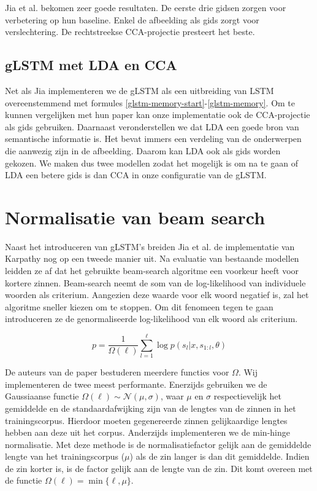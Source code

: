 Jia et al. bekomen zeer goede resultaten. De eerste drie gidsen zorgen voor verbetering op hun baseline. Enkel de afbeelding als gids zorgt voor verslechtering. De rechtstreekse CCA-projectie presteert het beste.

\subsection{gLSTM met LDA en CCA}
Net als Jia implementeren we de gLSTM als een uitbreiding van LSTM overeenstemmend met formules \ref{glstm-memory-start}-\ref{glstm-memory}.
Om te kunnen vergelijken met hun paper kan onze implementatie ook de CCA-projectie als gids gebruiken.
Daarnaast veronderstellen we dat LDA een goede bron van semantische informatie is. Het bevat immers een verdeling van de onderwerpen die aanwezig zijn in de afbeelding. Daarom kan LDA ook als gids worden gekozen.
We maken dus twee modellen zodat het mogelijk is om na te gaan of LDA een betere gids is dan CCA in onze configuratie van de gLSTM.

\section{Normalisatie van beam search}
Naast het introduceren van gLSTM's breiden Jia et al. \cite{Fernando2015} de implementatie van Karpathy nog op een tweede manier uit. Na evaluatie van bestaande modellen leidden ze af dat het gebruikte beam-search algoritme een voorkeur heeft voor kortere zinnen. Beam-search neemt de som van de log-likelihood van individuele woorden als criterium. Aangezien deze waarde voor elk woord negatief is, zal het algoritme sneller kiezen om te stoppen. Om dit fenomeen tegen te gaan introduceren ze de genormaliseerde log-likelihood van elk woord als criterium.

\begin{equation}
p = \frac{1}{\Omega(\ell)}\sum_{l=1}^{\ell} \log p(s_l | x, s_{1:l}, \theta)
\label{eq:log-sentence-norm}
\end{equation}

De auteurs van de paper bestuderen meerdere functies voor $\Omega$. Wij implementeren de twee meest performante.
Enerzijds gebruiken we de Gaussiaanse functie $\Omega(\ell) \sim \mathcal{N}(\mu, \sigma)$, waar $\mu$ en $\sigma$ respectievelijk het gemiddelde en de standaardafwijking zijn van de lengtes van de zinnen in het trainingscorpus. Hierdoor moeten gegenereerde zinnen gelijkaardige lengtes hebben aan deze uit het corpus. 
Anderzijds implementeren we de min-hinge normalisatie. Met deze methode is de normalisatiefactor gelijk aan de gemiddelde lengte van het trainingscorpus ($\mu$) als de zin langer is dan dit gemiddelde. Indien de zin korter is, is de factor gelijk aan de lengte van de zin. Dit komt overeen met de functie $\Omega(\ell)=\min\{\ell, \mu\}$.

